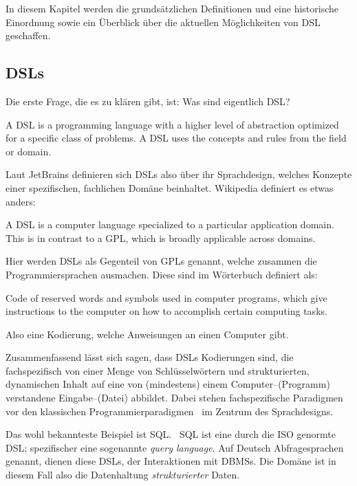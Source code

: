 In diesem Kapitel werden die grundsätzlichen Definitionen und eine historische Einordnung sowie ein Überblick über die aktuellen Möglichkeiten von \ac{DSL} geschaffen.

\subsection{\aclp{DSL}}\label{subsec:domain-specific-languages}
Die erste Frage, die es zu klären gibt, ist: Was sind eigentlich \ac{DSL}?
\begin{displayquote}
    A \ac{DSL} is a programming language with a higher level of abstraction optimized for a specific class of problems.
    A \ac{DSL} uses the concepts and rules from the field or domain.
\end{displayquote}
Laut JetBrains definieren sich \acp{DSL} also über ihr Sprachdesign, welches Konzepte einer spezifischen, fachlichen Domäne beinhaltet.
Wikipedia definiert es etwas anders:
\begin{displayquote}
    A \ac{DSL} is a computer language specialized to a particular application domain.
    This is in contrast to a \ac{GPL}, which is broadly applicable across domains.
\end{displayquote}
Hier werden \acp{DSL} als Gegenteil von \acp{GPL} genannt, welche zusammen die Programmiersprachen ausmachen.
Diese sind im Wörterbuch definiert als:
\begin{displayquote}
    Code of reserved words and symbols used in computer programs, which give instructions to the computer on how to accomplish certain computing tasks.
\end{displayquote}
Also eine Kodierung, welche Anweisungen an einen Computer gibt.

Zusammenfassend lässt sich sagen, dass \acp{DSL} Kodierungen sind, die fachspezifisch von einer Menge von Schlüsselwörtern und strukturierten, dynamischen Inhalt auf eine von (mindestens) einem Computer--(Programm) verstandene Eingabe--(Datei) abbildet.
Dabei stehen fachspezifische Paradigmen vor den klassischen Programmierparadigmen~\autocite{wikipedia-contributors-2024D} im Zentrum des Sprachdesigns.

Das wohl bekannteste Beispiel ist \ac{SQL}.~\autocite{unknown-author-2023}
\ac{SQL} ist eine durch die \ac{ISO} genormte \ac{DSL}; spezifischer eine sogenannte \textit{query language}.
Auf Deutsch Abfragesprachen genannt, dienen diese \acp{DSL}, der Interaktionen mit \acp{DBMS}.
Die Domäne ist in diesem Fall also die Datenhaltung \textit{strukturierter} Daten.

